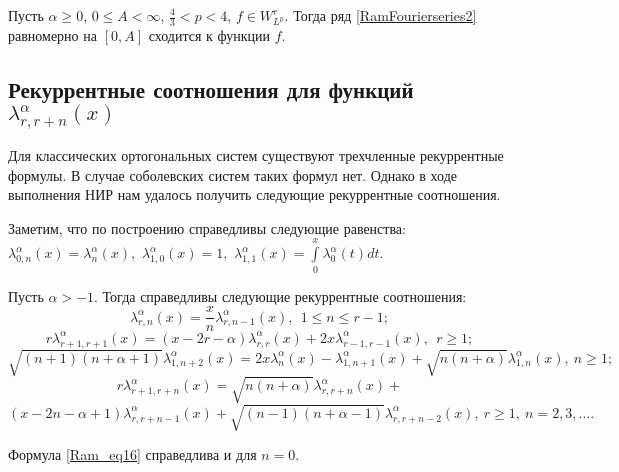 \begin{theorem}\label{Ram_thm1}
	Пусть $\alpha\geq0$, $0\leq A<\infty$, $\frac{4}{3}<p<4$, $f\in W^r_{L^p}$. Тогда ряд \eqref{RamFourierseries2} равномерно на $[0, A]$ сходится к функции $f$.
\end{theorem}

\subsection{Рекуррентные соотношения для функций $\lambda_{r,r+n}^{\alpha}(x)$}\label{Ram_sec4}
Для классических ортогональных систем существуют трехчленные рекуррентные формулы. В случае соболевских систем таких формул нет. Однако в ходе выполнения НИР нам удалось получить следующие рекуррентные соотношения.

Заметим, что по построению справедливы следующие равенства: $\lambda_{0,n}^\alpha(x)=\lambda_{n}^\alpha(x),$ $\lambda_{1,0}^\alpha(x)=1,$ $\lambda_{1,1}^\alpha(x)=\int\limits_0^x\lambda^\alpha_0(t)dt$.

\begin{theorem}\label{Ram_thm2}
	Пусть $\alpha>-1$. Тогда справедливы следующие рекуррентные соотношения:
	\begin{equation*}
	\lambda_{r,n}^\alpha(x)=\frac{x}{n}\lambda_{r,n-1}^\alpha(x), \ \ 1\leq n\leq r-1;
	\end{equation*}
	\begin{equation*}
	r\lambda_{r+1,r+1}^\alpha(x)=(x-2r-\alpha)\lambda_{r,r}^\alpha(x)+2x\lambda_{r-1,r-1}^\alpha(x), \ \ r\geq 1;
	\end{equation*}
	\begin{equation}\label{Ram_eq16}
	\sqrt{(n+1)(n+\alpha+1)}\lambda_{1,n+2}^\alpha(x)= 2x\lambda_{n}^{\alpha}(x)-\lambda_{1,n+1}^{\alpha}(x)+
	\sqrt{n(n+\alpha)} \lambda_{1,n}^{\alpha}(x), \ n\geq 1;
	\end{equation}
	$$
	r\lambda_{r+1,r+n}^\alpha(x)=\sqrt{n(n+\alpha)}\lambda_{r,r+n}^{\alpha}(x)+
	$$
	\begin{equation*}
	\left(x - 2n-\alpha+1\right)\lambda_{r,r+n-1}^{\alpha}(x)
	+\sqrt{(n-1)(n+\alpha-1)}\lambda_{r,r+n-2}^{\alpha}(x), \ r\geq 1, \ n=2, 3, \ldots.
	\end{equation*}
\end{theorem}

\begin{remark}
	Формула \eqref{Ram_eq16} справедлива и для $n=0$.
\end{remark}

